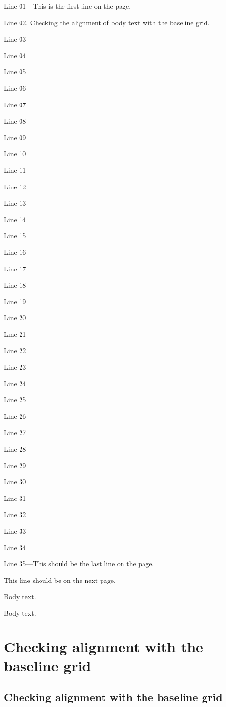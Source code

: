 \pagebreak

\begingroup
\setlength{\parindent}{0pt}
Line 01---This is the first line on the page.\displaybaselinegrid \par
Line 02. Checking the alignment of body text with the baseline grid. \par
Line 03 \par
Line 04 \par
Line 05 \par
Line 06 \par
Line 07 \par
Line 08 \par
Line 09 \par
Line 10 \par
Line 11 \par
Line 12 \par
Line 13 \par
Line 14 \par
Line 15 \par
Line 16 \par
Line 17 \par
Line 18 \par
Line 19 \par
Line 20 \par
Line 21 \par
Line 22 \par
Line 23 \par
Line 24 \par
Line 25 \par
Line 26 \par
Line 27 \par
Line 28 \par
Line 29 \par
Line 30 \par
Line 31 \par
Line 32 \par
Line 33 \par
Line 34 \par
Line 35---This should be the last line on the page. \par
This line should be on the next page. \par
Body text. \par
Body text. \par
\section*{Checking alignment with the baseline grid}
\subsection*{Checking alignment with the baseline grid}
